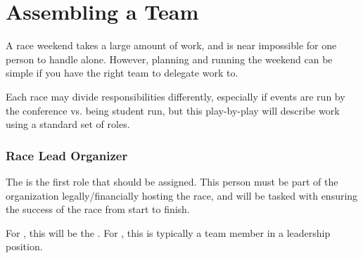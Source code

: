 \section{Assembling a Team}

A race weekend takes a large amount of work, and is near impossible for one person to handle alone.
However, planning and running the weekend can be simple if you have the right team to delegate work to.

Each race may divide responsibilities differently, especially if events are run by the conference
vs. being student run, but this play-by-play will describe work using a standard set of roles.

\subsubsection{Race Lead Organizer}

The %
is the first role that should be assigned.
This person must be part of the organization legally/financially hosting the race, and will be tasked with ensuring the success of the race
from start to finish.

For , %
this will be the %
.
For ,
this is typically a team member in a leadership position.
